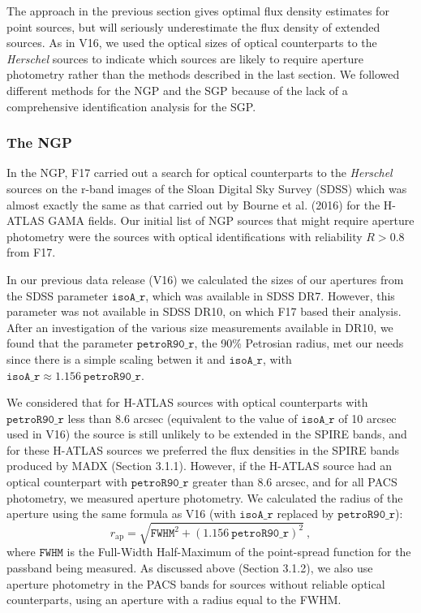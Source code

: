 \documentclass[useAMS,usenatbib]{mnras}
\begin{document}
The approach in the previous section gives optimal flux density
estimates for point sources, but will seriously underestimate the flux
density of extended sources.  As in V16, we used the optical sizes of
optical counterparts to the {\it Herschel} sources to indicate which
sources are likely to require aperture photometry rather than the
methods described in the last section.  We followed different methods
for the NGP and the SGP because of the lack of a comprehensive
identification analysis for the SGP.

\subsubsection{The NGP}

In the NGP, F17 carried out a search for optical counterparts to the
{\it Herschel} sources on the r-band images of the Sloan Digital Sky
Survey (SDSS) which was almost exactly the same as that carried out by
Bourne et al. (2016) for the H-ATLAS GAMA fields.  Our initial list of
NGP sources that might require aperture photometry were the sources
with optical identifications with reliability $R>0.8$ from F17.

In our previous data release (V16) we calculated the sizes of our
apertures from the SDSS parameter $\mathtt{isoA\_r}$, which was
available in SDSS DR7. However, this parameter was not available in
SDSS DR10, on which F17 based their analysis.  After an investigation
of the various size measurements available in DR10, we found that the
parameter $\mathtt{petroR90\_r}$, the 90\% Petrosian radius, met our
needs since there is a simple scaling betwen it and
$\mathtt{isoA\_r}$, with
$\mathtt{isoA\_r} \approx 1.156 \ \mathtt{petroR90\_r}$.

We considered that for H-ATLAS sources with optical counterparts with
$\mathtt{petroR90\_r}$ less than 8.6 arcsec (equivalent to the value
of $\mathtt{isoA\_r}$ of 10 arcsec used in V16) the source is still
unlikely to be extended in the SPIRE bands, and for these H-ATLAS
sources we preferred the flux densities in the SPIRE bands produced by
MADX (Section 3.1.1).  However, if the H-ATLAS source had an optical
counterpart with $\mathtt{petroR90\_r}$ greater than 8.6 arcsec, and
for all PACS photometry, we measured aperture photometry.  We
calculated the radius of the aperture using the same formula as V16
(with $\mathtt{isoA\_r}$ replaced by $\mathtt{petroR90\_r}$):
\smallskip
\begin{equation} 
r_\mathrm{ap} = \sqrt{ \mathtt{FWHM}^2 + {(1.156
    \ \mathtt{petroR90\_r})}^2}\ , 
\end{equation}
\smallskip where $\mathtt{FWHM}$ is the Full-Width Half-Maximum of the
point-spread function for the passband being measured. As discussed
above (Section 3.1.2), we also use aperture photometry in the PACS
bands for sources without reliable optical counterparts, using an
aperture with a radius equal to the FWHM.
\end{document}
